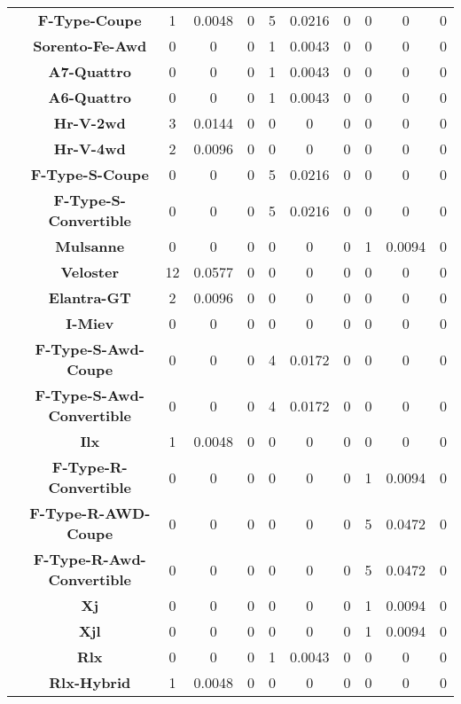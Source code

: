 \begin{center}
\begin{tabular}{|c|c||@{\hspace{1ex}}||c|c|c||@{\hspace{1ex}}||c|c|c||@{\hspace{1ex}}||c|c|c||@{\hspace{1ex}}||}
\cline{2-11}
  & {\bf F-Type-Coupe} & 1 & 0.0048 & 0 & 5 & 0.0216 & 0 & 0 & 0 & 0 \\
\cline{2-11}
  & {\bf Sorento-Fe-Awd} & 0 & 0 & 0 & 1 & 0.0043 & 0 & 0 & 0 & 0 \\
\cline{2-11}
  & {\bf A7-Quattro} & 0 & 0 & 0 & 1 & 0.0043 & 0 & 0 & 0 & 0 \\
\cline{2-11}
  & {\bf A6-Quattro} & 0 & 0 & 0 & 1 & 0.0043 & 0 & 0 & 0 & 0 \\
\cline{2-11}
  & {\bf Hr-V-2wd} & 3 & 0.0144 & 0 & 0 & 0 & 0 & 0 & 0 & 0 \\
\cline{2-11}
  & {\bf Hr-V-4wd} & 2 & 0.0096 & 0 & 0 & 0 & 0 & 0 & 0 & 0 \\
\cline{2-11}
  & {\bf F-Type-S-Coupe} & 0 & 0 & 0 & 5 & 0.0216 & 0 & 0 & 0 & 0 \\
\cline{2-11}
  & {\bf F-Type-S-Convertible} & 0 & 0 & 0 & 5 & 0.0216 & 0 & 0 & 0 & 0 \\
\cline{2-11}
  & {\bf Mulsanne} & 0 & 0 & 0 & 0 & 0 & 0 & 1 & 0.0094 & 0 \\
\cline{2-11}
  & {\bf Veloster} & 12 & 0.0577 & 0 & 0 & 0 & 0 & 0 & 0 & 0 \\
\cline{2-11}
  & {\bf Elantra-GT} & 2 & 0.0096 & 0 & 0 & 0 & 0 & 0 & 0 & 0 \\
\cline{2-11}
  & {\bf I-Miev} & 0 & 0 & 0 & 0 & 0 & 0 & 0 & 0 & 0 \\
\cline{2-11}
  & {\bf F-Type-S-Awd-Coupe} & 0 & 0 & 0 & 4 & 0.0172 & 0 & 0 & 0 & 0 \\
\cline{2-11}
  & {\bf F-Type-S-Awd-Convertible} & 0 & 0 & 0 & 4 & 0.0172 & 0 & 0 & 0 & 0 \\
\cline{2-11}
  & {\bf Ilx} & 1 & 0.0048 & 0 & 0 & 0 & 0 & 0 & 0 & 0 \\
\cline{2-11}
  & {\bf F-Type-R-Convertible} & 0 & 0 & 0 & 0 & 0 & 0 & 1 & 0.0094 & 0 \\
\cline{2-11}
  & {\bf F-Type-R-AWD-Coupe} & 0 & 0 & 0 & 0 & 0 & 0 & 5 & 0.0472 & 0 \\
\cline{2-11}
  & {\bf F-Type-R-Awd-Convertible} & 0 & 0 & 0 & 0 & 0 & 0 & 5 & 0.0472 & 0 \\
\cline{2-11}
  & {\bf Xj} & 0 & 0 & 0 & 0 & 0 & 0 & 1 & 0.0094 & 0 \\
\cline{2-11}
  & {\bf Xjl} & 0 & 0 & 0 & 0 & 0 & 0 & 1 & 0.0094 & 0 \\
\cline{2-11}
  & {\bf Rlx} & 0 & 0 & 0 & 1 & 0.0043 & 0 & 0 & 0 & 0 \\
\cline{2-11}
  & {\bf Rlx-Hybrid} & 1 & 0.0048 & 0 & 0 & 0 & 0 & 0 & 0 & 0 \\

\end{tabular}
\end{center}
